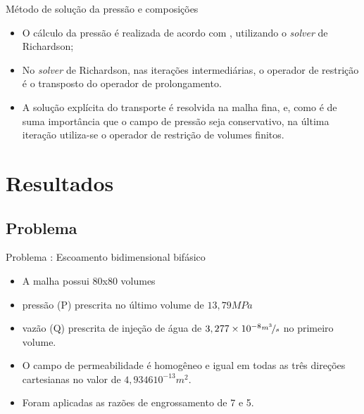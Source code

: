 \documentclass[professionalfont]{beamer}
\begin{document}
\begin{frame}{Método de solução da pressão e composições}

    \begin{itemize}
        \item O cálculo da pressão é realizada de acordo com , utilizando o \textit{solver} de Richardson;
        \item No \textit{solver} de Richardson, nas iterações intermediárias, o operador de restrição é o transposto do operador de prolongamento.
        \item A solução explícita do transporte é resolvida na malha fina, e, como é de suma importância que o campo de pressão seja conservativo, na última iteração utiliza-se o operador de restrição de volumes finitos. 
    \end{itemize}
    
\end{frame}

\renewcommand*{\theproblem}{%
    \arabic{problem}%
}

\section{Resultados}

\subsection{Problema \theproblem}
\begin{frame}{Problema \theproblem: Escoamento bidimensional bifásico}

    \begin{itemize}
        \item A malha possui 80x80 volumes
        \item pressão (P) prescrita no último volume de $13,79MPa$
        \item vazão (Q) prescrita de injeção de água de $ 3,277 \times 10^{-8} \nicefrac{m^{3}}{s}$ no primeiro volume. 
        \item O campo de permeabilidade é homogêneo e igual em todas as três direções cartesianas no valor de $4,9346 10^{-13} m^{2}$.
        \item Foram aplicadas as razões de engrossamento de 7 e 5.
    \end{itemize}

    
\end{frame}
\end{document}
